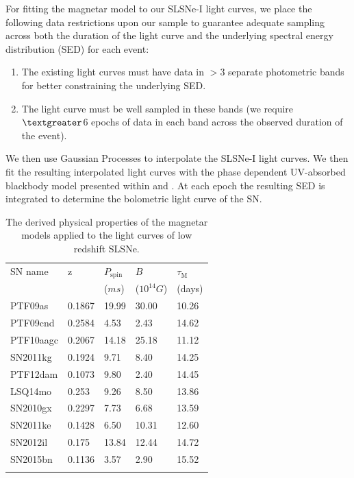 \documentclass[a4paper,fleqn,usenatbib]{mnras}
\begin{document}
For fitting the magnetar model to our SLSNe-I light curves, we place the following data restrictions upon our sample to guarantee adequate sampling across both the duration of the light curve and the underlying spectral energy distribution (SED) for each event:
\begin{enumerate}
    \item The existing light curves must have data in $>$3 separate photometric bands for better constraining the underlying SED.
    \item The light curve must be well sampled in these bands (we require $\textgreater$6 epochs of data in each band across the observed duration of the event).
\end{enumerate}

We then use Gaussian Processes to interpolate the SLSNe-I light curves. We then fit the resulting interpolated light curves with the phase dependent UV-absorbed blackbody model presented within \cite{Inserra2017Euclid} and \cite{Angus2018}. At each epoch the resulting SED is integrated to determine the bolometric light curve of the SN. 

\begin{table}
	\caption{The derived physical properties of the magnetar models applied to the light curves of low redshift SLSNe.}
	\centering
	\begin{tabular}{l l l l l} 
		\hline
		SN name 	&  z  	&  $P_{\mathrm{spin}}$	 &$B$& $\tau_{\mathrm{M}}$	 \\
		  		&       & ($ms$) 				& ($10^{14}G$)& (days)			 \\
		\hline
        PTF09as     &0.1867 &     19.99 &	30.00 &	10.26 \\
        PTF09cnd    &0.2584&     4.53  &  2.43 &14.62 \\
        PTF10aagc   & 0.2067&     14.18 &	25.18 &11.12 \\ 
        SN2011kg    &0.1924&     9.71  &  8.40 &14.25 \\
        PTF12dam    &0.1073&     9.80 &	2.40 &	14.45 \\
        LSQ14mo     &0.253&     9.26  &  8.50 &	13.86 \\
        SN2010gx    &0.2297&     7.73  &  6.68 & 13.59  \\
        SN2011ke    &0.1428&     6.50 &	10.31 &	12.60 \\
        SN2012il    &0.175&     13.84 &  12.44 & 14.72 \\
        SN2015bn    &0.1136 &     3.57  &  2.90 & 15.52 \\ 
		\hline
		\label{tab:slsnproperties}
	\end{tabular}
 \end{table}
\end{document}
